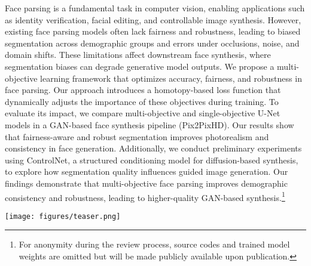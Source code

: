 Face parsing is a fundamental task in computer vision, enabling applications such as identity verification, facial editing, and controllable image synthesis. However, existing face parsing models often lack fairness and robustness, leading to biased segmentation across demographic groups and errors under occlusions, noise, and domain shifts. These limitations affect downstream face synthesis, where segmentation biases can degrade generative model outputs.
We propose a multi-objective learning framework that optimizes accuracy, fairness, and robustness in face parsing. Our approach introduces a homotopy-based loss function that dynamically adjusts the importance of these objectives during training. To evaluate its impact, we compare multi-objective and single-objective U-Net models in a GAN-based face synthesis pipeline (Pix2PixHD). Our results show that fairness-aware and robust segmentation improves photorealism and consistency in face generation. Additionally, we conduct preliminary experiments using ControlNet, a structured conditioning model for diffusion-based synthesis, to explore how segmentation quality influences guided image generation. Our findings demonstrate that multi-objective face parsing improves demographic consistency and robustness, leading to higher-quality GAN-based synthesis.\footnote{For anonymity during the review process, source codes and trained model weights are omitted but will be made publicly available upon publication.}

\begin{figure*}[t]
    \centering
    \texttt{[image: figures/teaser.png]}  
    \caption{
        \textbf{Overview of Our Multi-Objective Face Parsing and Synthesis Framework.} 
        Our proposed \textit{homotopy-based multi-objective learning framework} optimizes \textbf{accuracy} ($L_{\text{acc}}$), \textbf{robustness} ($L_{\text{rob}}$), and \textbf{fairness} ($L_{\text{fair}}$). 
        This framework produces \textbf{fairness-aware and robust segmentation maps}, which are used to train two generative pipelines: 
        (1) a \textbf{GAN-based synthesis model (Pix2PixHD)}, where improved segmentation enhances \textit{photorealism and demographic consistency}, and 
        (2) a \textbf{diffusion-based synthesis model (ControlNet)}, where structured parsing maps guide \textit{semantic alignment and editability}. The improved segmentation quality enhances photorealism, fairness, and robustness in generative models. Key improvements include reduced bias in GAN-generated faces and more stable semantic conditioning in diffusion synthesis.}
    \label{fig:teaser}
\end{figure*}
